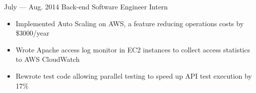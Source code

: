 \documentclass{newresume}
\begin{document}
\begin{body}
	{July --- Aug. 2014}
	{Back-end Software Engineer Intern}
	{}
	\begin{itemize}[noitemsep,topsep=0pt]
		\item Implemented Auto Scaling on AWS, a feature reducing operations costs by \$3000/year
		\item Wrote Apache access log monitor in EC2 instances to collect access statistics to AWS CloudWatch
		\item Rewrote test code allowing parallel testing to speed up API test execution by 17\%
	\end{itemize}
\end{body}

\smallskip

\end{document}

